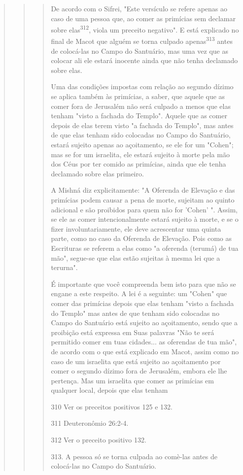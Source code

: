 \begin{quote}
\begin{quote}
\begin{quote}
De acordo com o Sifrei, "Este versículo se refere apenas ao caso de uma
pessoa que, ao comer as primícias sem declamar sobre
elas\textsuperscript{312}, viola um preceito negativo". E está explicado
no final de Macot que alguém se torna cul­pado
apenas\textsuperscript{313} antes de colocá-las no Campo do Santuário,
mas uma vez que as colocar ali ele estará inocente ainda que não tenha
declamado sobre elas.

Uma das condições impostas com relação ao segundo dízimo se aplica
também às primícias, a saber, que aquele que as comer fora de Jerusalém
não será culpado a menos que elas tenham "visto a fachada do Templo".
Aquele que as comer depois de elas terem visto "a fachada do Templo",
mas antes de que elas tenham sido colocadas no Campo do Santuário,
estará sujeito apenas ao açoitamento, se ele for um "Cohen"; mas se for
um israelita, ele estará sujei­to à morte pela mão dos Céus por ter
comido as primícias, ainda que ele tenha declamado sobre elas primeiro.

A Mishná diz explicitamente: "A Oferenda de Elevação e das primí­cias
podem causar a pena de morte, sujeitam ao quinto adicional e são
proibi­dos para quem não for 'Cohen' ". Assim, se ele as comer
intencionalmente es­tará sujeito à morte, e se o fizer
involuntariamente, ele deve acrescentar uma quinta parte, como no caso
da Oferenda de Elevação. Pois como as Escrituras se referem a elas como
"a oferenda (terumá) de tua mão", segue-se que elas estão sujeitas à
mesma lei que a terurna".

É importante que você compreenda bem isto para que não se enga­ne a este
respeito. A lei é a seguinte: um "Cohen" que comer das primícias de­pois
que elas tenham "visto a fachada do Templo" mas antes de que tenham sido
colocadas no Campo do Santuário está sujeito ao açoitamento, sendo que a
proibição está expressa em Suas palavras "Não te será permitido comer em
tuas cidades... as oferendas de tua mão", de acordo com o que está
explicado em Macot, assim como no caso de um israelita que está sujeito
ao açoitamento por comer o segundo dízimo fora de Jerusalém, embora ele
lhe pertença. Mas um israelita que comer as primícias em qualquer local,
depois que elas tenham

310 Ver os preceitos positivos 125 e 132.

311 Deuteronômio 26:2-4.

312 Ver o preceito positivo 132.

313. A pessoa só se torna culpada ao comè-las antes de colocá-las no
Campo do Santuário.



\end{quote}
\end{quote}
\end{quote}
